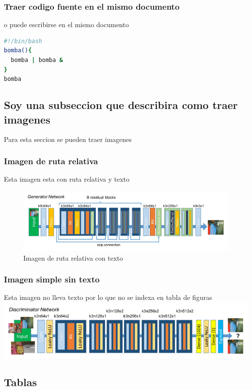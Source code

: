 \documentclass[journal]{IEEEtran}
\begin{document}
\subsubsection{Traer codigo fuente en el mismo documento}
o puede escribirse en el mismo documento
\begin{lstlisting}[language=bash, caption=Bomba fork,label={lst:bomba_fork}]
#!/bin/bash
bomba(){
  bomba | bomba & 
}
bomba
\end{lstlisting}

\subsection{Soy una subseccion que describira como traer imagenes}
Para esta seccion se pueden traer imagenes
\subsubsection{Imagen de ruta relativa}
Esta imagen esta con ruta relativa y texto
\begin{figure}[H]
    \centering
    \includegraphics[scale=.20]{images/Generador.png}
     \caption{Imagen de ruta relativa con texto}
     \label{fig:SRGANGEN}
 \end{figure}
 \subsubsection{Imagen simple sin texto}
Esta imagen no lleva texto por lo que no se indexa en tabla de figuras
\includegraphics[scale=.28]{images/Discriminador.png}

\subsection{Tablas}
\end{document}
